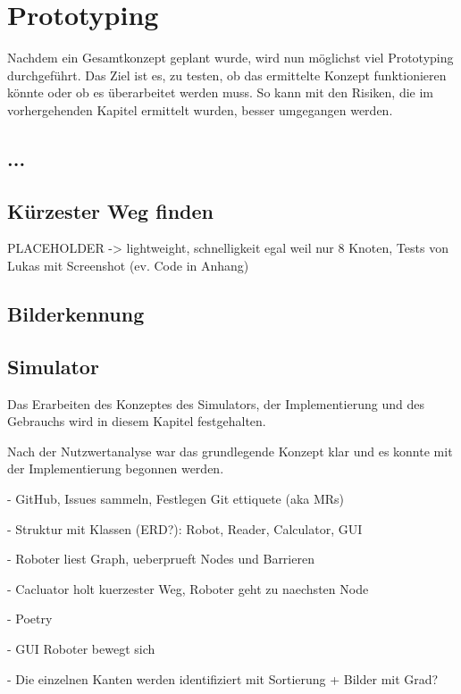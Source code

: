 \section{Prototyping}

Nachdem ein Gesamtkonzept geplant wurde, wird nun möglichst viel Prototyping durchgeführt. Das Ziel ist es, zu testen, ob das ermittelte Konzept funktionieren könnte oder ob es überarbeitet werden muss. So kann mit den Risiken, die im vorhergehenden Kapitel ermittelt wurden, besser umgegangen werden.

\subsection{...}

\subsection{Kürzester Weg finden}

PLACEHOLDER
-> lightweight, schnelligkeit egal weil nur 8 Knoten, Tests von Lukas mit Screenshot (ev. Code in Anhang)

\subsection{Bilderkennung}

\subsection{Simulator}

Das Erarbeiten des Konzeptes des Simulators, der Implementierung und des Gebrauchs wird in diesem Kapitel festgehalten.

Nach der Nutzwertanalyse war das grundlegende Konzept klar und es konnte mit der Implementierung begonnen werden.

- GitHub, Issues sammeln, Festlegen Git ettiquete (aka MRs)

- Struktur mit Klassen (ERD?): Robot, Reader, Calculator, GUI

- Roboter liest Graph, ueberprueft Nodes und Barrieren

- Cacluator holt kuerzester Weg, Roboter geht zu naechsten Node

- Poetry

- GUI Roboter bewegt sich

- Die einzelnen Kanten werden identifiziert mit Sortierung + Bilder mit Grad?